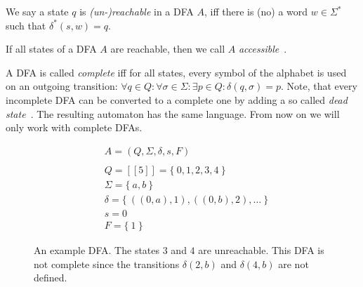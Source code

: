 \begin{definition}\label{ch:2:unreachable-states}
	We say a state $q$ is \emph{(un-)reachable} in a DFA $A$, iff there is (no) a word $w \in \Sigma^*$ such that $\delta^*(s, w) = q$.
\end{definition}
\noindent If all states of a DFA $A$ are reachable, then we call $A$ \emph{accessible}~\cite[p. 2]{CP05}.

A DFA is called \emph{complete} iff for all states, every symbol of the alphabet is used on an outgoing transition: $\forall q\in Q\colon \forall\sigma\in\Sigma\colon \exists p\in Q\colon \delta(q,\sigma) = p$. Note, that every incomplete DFA can be converted to a complete one by adding a so called \emph{dead state}~\cite[p. 67]{HMU01}. The resulting automaton has the same language. From now on we will only work with complete DFAs.

\begin{figure}[H]
	\begin{subfigure}{.5\textwidth}\centering{}\end{subfigure}
	\hfill
	\begin{subfigure}{.4\textwidth}
		\begin{align*}
			&A = (Q, \Sigma, \delta, s ,F) \\
			&\\
			&Q = [[5]] = \{\ 0,1,2,3,4\ \} \\
			&\Sigma = \{\ a,b\ \} \\
			&\delta = \{\ ((0,a),1), ((0,b),2), \ldots\ \} \\
			&s = 0 \\
			&F = \{\ 1\ \}
		\end{align*}
	\end{subfigure}
	\caption{An example DFA. The states $3$ and $4$ are unreachable. This DFA is not complete since the transitions $\delta(2,b)$ and $\delta(4,b)$ are not defined.}
	\label{fig:dfa}
\end{figure}

